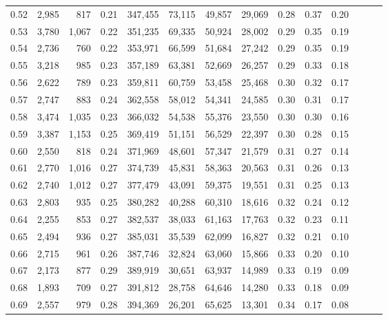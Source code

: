 \begin{tabular}{rrrrrrrrrrrrrr}
0.52 &   2,985 &    817 &  0.21 &  347,455 &   73,115 &  49,857 &  29,069 &  0.28 &  0.37 &      0.20 \\
0.53 &   3,780 &  1,067 &  0.22 &  351,235 &   69,335 &  50,924 &  28,002 &  0.29 &  0.35 &      0.19 \\
0.54 &   2,736 &    760 &  0.22 &  353,971 &   66,599 &  51,684 &  27,242 &  0.29 &  0.35 &      0.19 \\
0.55 &   3,218 &    985 &  0.23 &  357,189 &   63,381 &  52,669 &  26,257 &  0.29 &  0.33 &      0.18 \\
0.56 &   2,622 &    789 &  0.23 &  359,811 &   60,759 &  53,458 &  25,468 &  0.30 &  0.32 &      0.17 \\
0.57 &   2,747 &    883 &  0.24 &  362,558 &   58,012 &  54,341 &  24,585 &  0.30 &  0.31 &      0.17 \\
0.58 &   3,474 &  1,035 &  0.23 &  366,032 &   54,538 &  55,376 &  23,550 &  0.30 &  0.30 &      0.16 \\
0.59 &   3,387 &  1,153 &  0.25 &  369,419 &   51,151 &  56,529 &  22,397 &  0.30 &  0.28 &      0.15 \\
0.60 &   2,550 &    818 &  0.24 &  371,969 &   48,601 &  57,347 &  21,579 &  0.31 &  0.27 &      0.14 \\
0.61 &   2,770 &  1,016 &  0.27 &  374,739 &   45,831 &  58,363 &  20,563 &  0.31 &  0.26 &      0.13 \\
0.62 &   2,740 &  1,012 &  0.27 &  377,479 &   43,091 &  59,375 &  19,551 &  0.31 &  0.25 &      0.13 \\
0.63 &   2,803 &    935 &  0.25 &  380,282 &   40,288 &  60,310 &  18,616 &  0.32 &  0.24 &      0.12 \\
0.64 &   2,255 &    853 &  0.27 &  382,537 &   38,033 &  61,163 &  17,763 &  0.32 &  0.23 &      0.11 \\
0.65 &   2,494 &    936 &  0.27 &  385,031 &   35,539 &  62,099 &  16,827 &  0.32 &  0.21 &      0.10 \\
0.66 &   2,715 &    961 &  0.26 &  387,746 &   32,824 &  63,060 &  15,866 &  0.33 &  0.20 &      0.10 \\
0.67 &   2,173 &    877 &  0.29 &  389,919 &   30,651 &  63,937 &  14,989 &  0.33 &  0.19 &      0.09 \\
0.68 &   1,893 &    709 &  0.27 &  391,812 &   28,758 &  64,646 &  14,280 &  0.33 &  0.18 &      0.09 \\
0.69 &   2,557 &    979 &  0.28 &  394,369 &   26,201 &  65,625 &  13,301 &  0.34 &  0.17 &      0.08 \\

\end{tabular}
